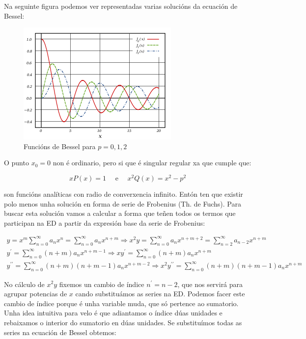 \documentclass[a4paper,12pt,titlepage]{article}
\begin{document}
Na seguinte figura podemos ver representadas varias solucións da ecuación de Bessel:

\begin{figure}[h!]
    \centering
    \includegraphics[width=0.75\linewidth]{Images/bessel.png}
    \caption{Funcións de Bessel para $p=0,1,2$}
\end{figure}

O punto $x_0=0$ non é ordinario, pero si que é singular regular xa que cumple que:

$$
x P(x)=1 \quad \text { e } \quad x^{2} Q(x)=x^{2}-p^{2}
$$

son funcións analíticas con radio de converxencia infinito. Entón ten que existir polo menos unha solución en forma de serie de Frobenius (Th. de Fuchs). Para buscar esta solución vamos a calcular a forma que teñen todos os termos que participan na ED a partir da expresión base da serie de Frobenius:

\begin{equation*}
    \begin{gathered}
        y = x^{m}\sum_{n=0}^{\infty}a_{n} x^{n}=\sum_{n=0}^{\infty} a_{n} x^{n+m}  \Rightarrow  x^{2} y=\sum_{n=0}^{\infty} a_{n} x^{n+m+2}=\sum_{n=2}^{\infty} a_{n-2} x^{n+m}\\
        y^{\prime} =  \sum_{n=0}^{\infty}(n+m) a_{n} x^{n+m-1}  \Rightarrow  x y^{\prime}=\sum_{n=0}^{\infty}(n+m)a_{n} x^{n+m} \\
        y^{\prime \prime} = \sum_{n=0}^{\infty}(n+m)(n+m-1) a_{n} x^{n+m-2}  \Rightarrow  x^2y^{\prime \prime} = \sum_{n=0}^{\infty}(n+m)(n+m-1) a_{n} x^{n+m}
    \end{gathered}
\end{equation*}

No cálculo de $x^2y$ fixemos un cambio de índice $n^{\prime}=n-2$, que nos servirá para agrupar potencias de $x$ cando substituámos as series na ED. Podemos facer este cambio de índice porque é unha variable muda, que só pertence ao sumatorio. Unha idea intuitiva para velo é que adiantamos o índice dúas unidades e rebaixamos o interior do sumatorio en dúas unidades. Se substituímos todas as series na ecuación de Bessel obtemos:
\end{document}
